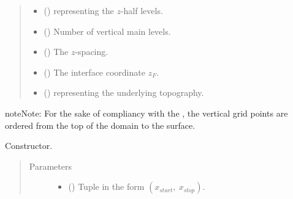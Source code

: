 \documentclass[letterpaper,10pt,english]{sphinxmanual}
\begin{document}
\begin{fulllineitems}
\begin{quote}
\begin{description}
\begin{itemize}
\item {} 
 () \textendash{} {\hyperref[\detokenize{api:tasmania.grids.axis.Axis}]{}} representing the \(z\)-half levels.

\item {} 
 () \textendash{} Number of vertical main levels.

\item {} 
 () \textendash{} The \(z\)-spacing.

\item {} 
 () \textendash{} The interface coordinate \(z_F\).

\item {} 
{\hyperref[\detokenize{api:module-tasmania.grids.topography}]{}} () \textendash{} {\hyperref[\detokenize{api:tasmania.grids.topography.Topography2d}]{}} representing the underlying topography.

\end{itemize}

\end{description}\end{quote}

\begin{sphinxadmonition}{note}{Note:}
For the sake of compliancy with the , the vertical grid points are ordered
from the top of the domain to the surface.
\end{sphinxadmonition}

\begin{fulllineitems}
\label{\detokenize{api:tasmania.grids.grid_xyz.GridXYZ.__init__}}
Constructor.
\begin{quote}\begin{description}
\item[{Parameters}] \leavevmode\begin{itemize}
\item {} 
 () \textendash{} Tuple in the form \((x_{start}, ~ x_{stop})\).


\end{itemize}
\end{description}
\end{quote}
\end{fulllineitems}
\end{fulllineitems}
\end{document}
